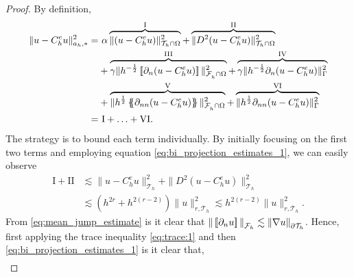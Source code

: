 \begin{proof}
    By definition,
    \begin{equation}
        \begin{split}
            \| u - C_{h}^{e}u \|_{ a_{h}, * }^{  2}  =& \ \alpha  \overbrace{\|  ( u - C_{h}^{e}u) \|_{ \mathcal{T} _{h} \cap \Omega  }^{ 2}}^{\mathrm{I} }   + \overbrace{\| D^2 ( u - C_{h}^{e}u ) \|_{\mathcal{T} _{h} \cap \Omega   }^{ 2
            }}^{\mathrm{II} }  \\  &  +
            \overbrace{\gamma \| h^{-\frac{1}{2}} \jump{ \partial _{n} (u -
        C_{h}^{e} u) }   \|_{ \mathcal{F}_{h}^{}\cap \Omega    }^{ 2
        }}^{\mathrm{III} }  + \overbrace{\gamma \| h^{-\frac{1}{2}}  \partial _{n} (u - C_{h}^{e}u)    \|_{ \Gamma   }^{ 2 }}^{\mathrm{IV} }  \\
          & + \overbrace{\| h^{\frac{1}{2}} \mean{ \partial _{nn} (u - C_{h}^{e}u) }   \|_{\mathcal{F} _{h}^{} \cap \Omega   }^{  2}}^{\mathrm{V} }  +  \overbrace{\| h^{\frac{1}{2}} \partial _{nn}(u - C_{h}^{e}u)     \|_{ \Gamma }^{  2}}^{\mathrm{VI}
          } \\
          =& \  \mathrm{I}  + \ldots + \mathrm{VI}.
        \end{split}
    \end{equation}
    The strategy is to bound each term individually.
    By initially focusing on the first two terms and employing equation \eqref{eq:bi_projection_estimates_1}, we can easily observe
             \begin{equation}
        \begin{split}
            \mathrm{I} +\mathrm{II}  & \lesssim \|   u - C_{h}^{e}u \|_{ \mathcal{T} _{h}  }^{ 2} + \|  D^2( u - C_{h}^{e}u )  \|_{\mathcal{T} _{h} }^{ 2 } \\
                                     & \lesssim  ( h^{2r}  + h^{2(r-2)} )\| u \|_{r,\mathcal{T}_{h} }^{  2} \lesssim h^{2(r -2)} \| u
                                     \|_{r, \mathcal{T} _{h} }^{2  }  .
        \end{split}
             \end{equation}
    From \eqref{eq:mean_jump_estimate} is it clear that $\| \left[\!\left[  \partial _{n} u  \right]\!\right]   \|_{ \mathcal{F}_{h}   }^{  } \lesssim \| \nabla  u \|_{ \partial  \mathcal{T} _{h} }^{  }   $. Hence, first applying the trace inequality \eqref{eq:trace:1}  and then
    \eqref{eq:bi_projection_estimates_1} is it clear that,
    \begin{equation}
        \begin{split}

\end{split}
\end{equation}
\end{proof}
